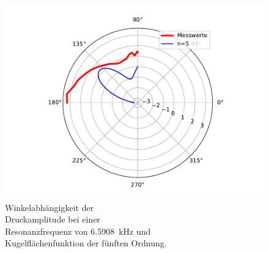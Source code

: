 \begin{figure}
\begin{minipage}[b]{.4\linewidth}
        \includegraphics[width=\linewidth]{figure/Resonanz_Drewinkel_Amplitude_6_n5.pdf}
        \caption{Winkelabhängigkeit der\\ Druckamplitude bei einer \\ Resonanzfrequenz von \SI{6.5908}{\kilo\hertz} und \\ Kugelflächenfunktion der fünften Ordnung.}
     \end{minipage}
\end{figure}
